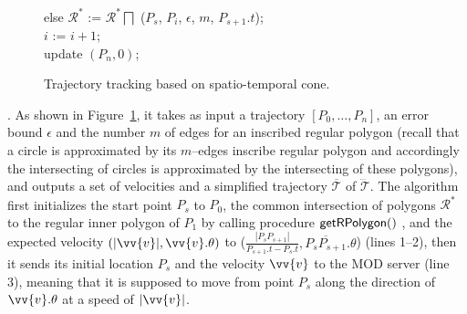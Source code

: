 \begin{figure}[tb!]
\begin{center}
{\begin{minipage}{3.3in}
{					\icc \>\hspace{3ex} else $\mathcal{R}^*$ := $\mathcal{R}^*\bigsqcap$ ($P_s$, $P_{i}$, $\epsilon$, $m$, $P_{s+1}.t$); \\
					\icc \>\hspace{3ex} $i$ := $i +1$;	\\
					\icc \>\hspace{0ex} update $(P_{n}, 0)$; 
				}
				\vspace{-2ex}
				\myhrule
			\end{minipage}
		}
	\end{center}
	\vspace{-2ex}
	\caption{\small Trajectory tracking based on spatio-temporal cone.}
	\label{alg:citt-s-full}
	\vspace{-3ex}
\end{figure}

.
As shown in Figure~\ref{alg:citt-s-full}, it takes as input a trajectory ${[P_0, \ldots, P_n]}$, an error bound $\epsilon$ and the number $m$ of edges for an inscribed regular polygon (recall that a circle is approximated by its $m$--edges inscribe regular polygon and accordingly the intersecting of circles is approximated by the intersecting of these polygons), and outputs a set of velocities and a simplified  trajectory $\overline{\mathcal{T}}$ of $\dddot{\mathcal{T}}$.
%
The algorithm first initializes the start point $P_s$ to $P_0$, the common intersection of polygons $\mathcal{R}^*$ to the regular inner polygon of $P_1$ by calling procedure ${\mathsf{getRPolygon}}()$ \cite{Lin:Cised}, and the expected velocity $(|\vv{v}|, \vv{v}.\theta)$ to ($\frac{|P_{s}P_{s+1}|}{P_{s+1}.t-P_s.t},\overline{P_{s}P_{s+1}}.\theta$) (lines 1--2), then it sends its initial location $P_s$ and the velocity $\vv{v}$ to the MOD server (line 3), meaning that it is supposed to move from point $P_s$ along the direction of $\vv{v}.\theta$ at a speed of $|\vv{v}|$.

